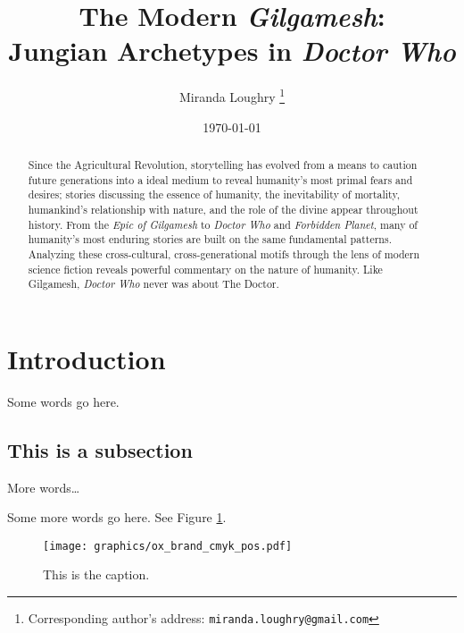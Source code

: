 \documentclass[10pt,a4paper]{article}
\begin{document}
\title{The Modern \emph{Gilgamesh}: \\
Jungian Archetypes in \emph{Doctor Who}}

\author{Miranda Loughry%
\thanks{Corresponding author's address: \texttt{miranda.loughry@gmail.com}}}

\date{\today}

\maketitle

\begin{abstract}
Since the Agricultural Revolution, storytelling has evolved from a means to
caution future generations into a ideal medium to reveal humanity's most
primal fears and desires; stories discussing the essence of humanity, the
inevitability of mortality, humankind's relationship with nature, and the
role of the divine appear throughout history. From the \emph{Epic of
Gilgamesh} to \emph{Doctor Who} and \emph{Forbidden Planet}, many of
humanity's most enduring stories are built on the same fundamental
patterns. Analyzing these cross-cultural, cross-generational motifs through
the lens of modern science fiction reveals powerful commentary on the
nature of humanity. Like Gilgamesh, \emph{Doctor Who} never was about The
Doctor.
\end{abstract}

\section{Introduction}

Some words go here.

\subsection{This is a subsection}

More words\ldots

\newpage

Some more words go here. See Figure \ref{figure:whatever}.

\begin{figure}[!t]
    \centering
	\texttt{[image: graphics/ox\_brand\_cmyk\_pos.pdf]}
	\caption{This is the caption.}
	\label{figure:whatever}
\end{figure}
\end{document}

